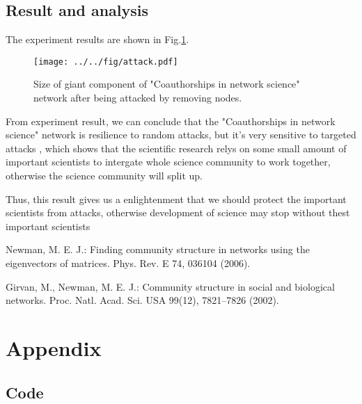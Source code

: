 \documentclass[runningheads]{llncs}
\begin{document}
\subsection{Result and analysis}

The experiment results are shown in Fig.\ref{fig:attack}.

\begin{figure}
    \centering
    \texttt{[image: ../../fig/attack.pdf]}
    \caption{Size of giant component of "Coauthorships in network science" network after being attacked by removing nodes.} 
    \label{fig:attack}
\end{figure}

From experiment result, we can conclude that the "Coauthorships in network science" network 
is resilience to random attacks, but it's very sensitive to targeted attacks
, which shows that the scientific research relys on some small 
amount of important scientists to intergate whole science community to work together, 
otherwise the science community will split up.

Thus, this result gives us a enlightenment that we should protect the important scientists from attacks, 
otherwise development of science may stop without thest important scientists

\newpage
\begin{thebibliography}{8}
    Newman, M. E. J.: Finding community structure in networks using the eigenvectors of matrices. Phys. Rev. E 74, 036104 (2006).

    Girvan, M., Newman, M. E. J.: Community structure in social and biological 
    networks. Proc. Natl. Acad. Sci. USA 99(12), 7821–7826 (2002). 
\end{thebibliography}

\section*{Appendix}

\subsection*{Code}
\inputminted{python}{../../code/main.py}
\end{document}
